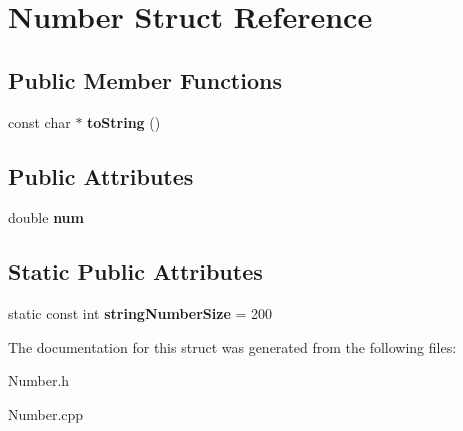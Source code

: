 \hypertarget{struct_number}{
\section{Number Struct Reference}
\label{struct_number}
}
\subsection*{Public Member Functions}
\begin{DoxyCompactItemize}
\item 
\hypertarget{struct_number_a465cef1eb6dbaa3741d987df52e4df1f}{
const char $\ast$ {\bfseries toString} ()}
\label{struct_number_a465cef1eb6dbaa3741d987df52e4df1f}

\end{DoxyCompactItemize}
\subsection*{Public Attributes}
\begin{DoxyCompactItemize}
\item 
\hypertarget{struct_number_a4935cf931b2603e03a356b6981b223da}{
double {\bfseries num}}
\label{struct_number_a4935cf931b2603e03a356b6981b223da}

\end{DoxyCompactItemize}
\subsection*{Static Public Attributes}
\begin{DoxyCompactItemize}
\item 
\hypertarget{struct_number_a46afc3dcc87e83f7708a280d2283324e}{
static const int {\bfseries stringNumberSize} = 200}
\label{struct_number_a46afc3dcc87e83f7708a280d2283324e}

\end{DoxyCompactItemize}


The documentation for this struct was generated from the following files:\begin{DoxyCompactItemize}
\item 
Number.h\item 
Number.cpp\end{DoxyCompactItemize}
